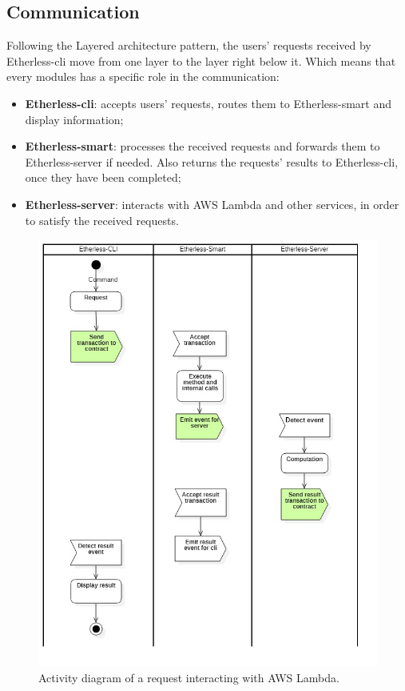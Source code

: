 	\subsection{Communication} %
	Following the Layered architecture pattern, the users' requests received by Etherless-cli move from one layer to the layer right below it. Which means that every modules has a specific role in the communication:
	\begin{itemize}
		\item \textbf{Etherless-cli}: accepts users' requests, routes them to Etherless-smart and display information;
		\item \textbf{Etherless-smart}: processes the received requests and forwards them to Etherless-server if needed. Also returns the requests' results to Etherless-cli, once they have been completed;
		\item \textbf{Etherless-server}: interacts with AWS Lambda and other services, in order to satisfy the received requests.
	\end{itemize}
	\begin{figure}
		\centering
		\includegraphics[width=0.9\linewidth]{diagrammi/generali/activity_diag_pattern2}
		\caption{Activity diagram of a request interacting with AWS Lambda.}
	\end{figure}
